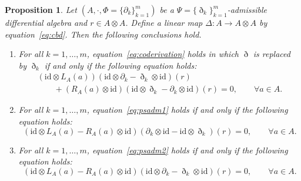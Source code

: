 \documentclass[pdftex]{sigma}
\numberwithin{equation}{section}
\newtheorem{Proposition}[Theorem]{Proposition}
{ \theoremstyle{definition}
	\newtheorem{Definition}[Theorem]{Definition}
	\newtheorem{Note}[Theorem]{Note}
	\newtheorem{Example}[Theorem]{Example}
	\newtheorem{Remark}[Theorem]{Remark} }
\newcommand{\id}{\mathrm{id}}
\begin{document}
\begin{Proposition}\label{pro:cobAdmeq}
 Let $(A, \cdot, \Phi = \{\partial_k\}_{k=1}^m)$ be a $\Psi = \{\eth_k\}_{k=1}^m$-admissible differential algebra and $r \in A \otimes A$.
 Define a linear map $\Delta\colon A \to A \otimes A$ by equation~\eqref{eq:cbd}.
 Then the following conclusions hold.
 \begin{enumerate}\itemsep=0pt
 \item[$1.$] For all $k=1, \dots, m$, equation~\eqref{eq:coderivation} holds
 in which $\eth$ is replaced by $\eth_k$ if and only if the following equation holds:
 \begin{gather}
 ( \id \otimes L_A(a) )(\id \otimes \partial_k - \eth_k \otimes \id)(r) \nonumber\\
 \qquad{} + (R_A(a)\otimes \id )(\id \otimes \eth_k - \partial_k \otimes \id)(r) = 0, \qquad \forall a \in A. \label{eq:cobdcod}
 \end{gather}
 \item[$2.$] \label{it:2} For all $k=1, \dots, m$, equation~\eqref{eq:psadm1} holds if and only if the following equation holds:
 \begin{equation}
 (\id \otimes L_A(a) - R_A(a) \otimes \id )(\partial_k \otimes \id - \id \otimes \eth_k)(r) = 0, \qquad \forall a \in A. \label{eq:cobpsadm1}
 \end{equation}
 \item[$3.$] \label{it:3} For all $k=1, \dots, m$, equation~\eqref{eq:psadm2} holds if and only if the following equation holds:
 \begin{equation}
 (\id \otimes L_A(a) - R_A(a) \otimes \id )(\id \otimes \partial_k - \eth_k \otimes \id)(r) = 0, \qquad \forall a \in A. \label{eq:cobpsadm2}
 \end{equation}
 \end{enumerate}
\end{Proposition}
\end{document}
